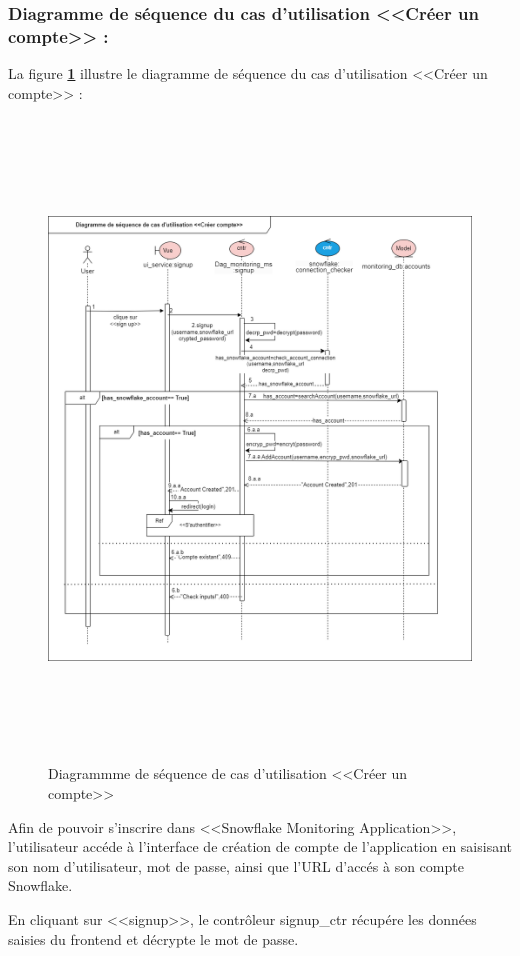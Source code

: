     \subsubsection{Diagramme de séquence du cas d'utilisation <<Créer un compte>> :}
    \par La figure \textbf{\ref*{fig :seq3}} illustre le diagramme de séquence du cas d'utilisation <<Créer un compte>> :
    \begin{figure}[H]
        \centering
        \includegraphics[height=17cm]{img/conception/signup.png}
        \caption{Diagrammme de séquence de cas d'utilisation <<Créer un compte>> }
        \label{fig :seq3}
    \end{figure}
    \par Afin de pouvoir s'inscrire dans <<Snowflake Monitoring Application>>, l'utilisateur accéde à l'interface de création de compte de l'application en saisisant son nom d'utilisateur, mot de passe, 
    ainsi que l'URL d'accés à son compte Snowflake.
    \par En cliquant sur <<signup>>, le contrôleur signup\_ctr récupére les données saisies du frontend et décrypte le mot de passe.
